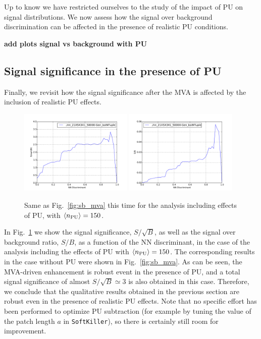 Up to know we have restricted ourselves to the study of the impact of PU
on signal distributions.
%
We now assess how the signal over background discrimination can be affected
in the presence of realistic PU conditions.

{\bf add plots signal vs background with PU}


\subsection{Signal significance in the presence of PU}

Finally, we revisit how the signal significance after the MVA
is affected by the inclusion of realistic PU effects.


\begin{figure}[t]
\begin{center}
\includegraphics[width=0.48\textwidth]{plots/ssb_pu.pdf}
\includegraphics[width=0.48\textwidth]{plots/sb_pu.pdf}
\caption{\small
  Same as Fig.~\ref{fig:sb_mva} this time for the analysis including
  effects of PU, with $\left\langle n_{\rm PU}\right\rangle=150$.
}
\label{fig:sb_mva_pu}
\end{center}
\end{figure}

In Fig.~\ref{fig:sb_mva_pu} we show the signal significance,
$S/\sqrt{B}$, as well as the signal over background ratio,
$S/B$, as a function of the NN discriminant, in the case
of the analysis including the effects of PU
with $\left\langle n_{\rm PU}\right\rangle=150$.
%
The corresponding results in the case without PU were shown in
Fig.~\ref{fig:sb_mva}.
%
As can be seen, the MVA-driven enhancement is robust event in the
presence of PU, and a total signal significance of
almost $S/\sqrt{B}\simeq 3$ is also obtained in this case.
%
Therefore, we conclude that the qualitative results obtained
in the previous section are robust even in the presence
of realistic PU effects.
%
Note that no specific effort has been performed to
optimize PU subtraction (for example by tuning the value
of the patch length $a$ in {\tt SoftKiller}), so there is
certainly still room for improvement.

